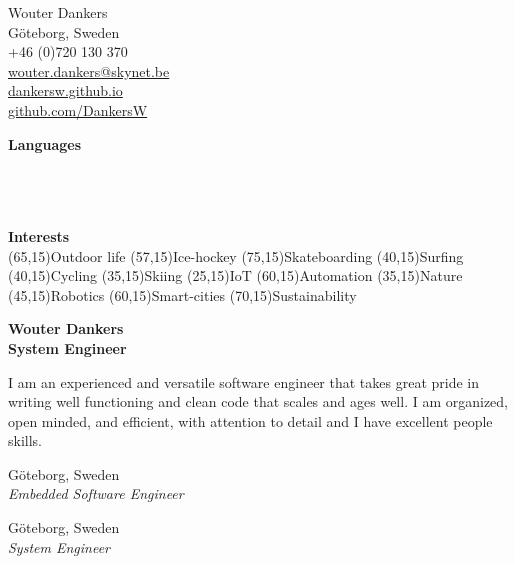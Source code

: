 \documentclass[a4paper,12pt,final]{memoir}
\begin{document}
\begin{flushright}\small
	Wouter Dankers \\
	G\"oteborg, Sweden \\
	+46 (0)720 130 370 \\
	\url{wouter.dankers@skynet.be}  \\
	\url{dankersw.github.io} \\
	\url{github.com/DankersW} \\
	\Sep
	
	{\Large\textbf{Languages}}
	 \\
     \\
     \\
     \\
	\Sep
	\Sep
	
    {\Large\textbf{Interests}}\\
	\SmallSep
    \framebox(65,15){Outdoor life} \framebox(57,15){Ice-hockey} \framebox(75,15){Skateboarding} \framebox(40,15){Surfing} \framebox(40,15){Cycling} \framebox(35,15){Skiing} \framebox(25,15){IoT} \framebox(60,15){Automation} \framebox(35,15){Nature} \framebox(45,15){Robotics} \framebox(60,15){Smart-cities} \framebox(70,15){Sustainability} \\
    \Sep

    
\end{flushright}\normalsize
\framebreak

\Huge\bfseries {\color{RoyalBlue} Wouter Dankers} \\
\Large\bfseries  System Engineer \\

\normalsize\normalfont

\begin{AboutMe}
I am an experienced and versatile software engineer that takes great pride in writing well functioning and clean code that scales and ages well. I am organized, open minded, and efficient, with attention to detail and I have excellent people skills.

\end{AboutMe}

 \hfill G\"oteborg, Sweden \\
\emph{Embedded Software Engineer}
\SmallSep

 \hfill G\"oteborg, Sweden \\
\emph{System Engineer}
\SmallSep
\end{document}
